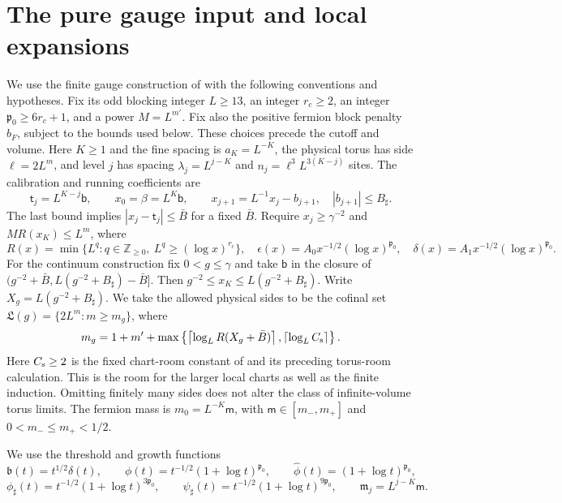 \documentclass[11pt,letterpaper,reqno]{amsart}
\theoremstyle{definition}
\theoremstyle{remark}
\begin{document}
\section{The pure gauge input and local expansions}\label{sec:qcd-gauge-input}

We use the finite gauge construction of \cite{YMM1} with the following
conventions and hypotheses. Fix its odd blocking integer $L\ge13$,
an integer $r_c\ge2$, an integer $\mathfrak p_0\ge6r_c+1$,
and a power $M=L^{m'}$. Fix also the positive fermion block
penalty $b_F$, subject to the bounds used below. These choices
precede the cutoff and volume. Here $K\ge1$ and the fine spacing is $a_K=L^{-K}$,
the physical torus has side $\ell=2L^m$, and level $j$ has spacing
$\lambda_j=L^{j-K}$ and $n_j=\ell^3L^{3(K-j)}$ sites.
The calibration and running coefficients are
\[
 \mathsf t_j=L^{K-j}\mathsf b,\qquad
 x_0=\beta=L^K\mathsf b,\qquad
 x_{j+1}=L^{-1}x_j-b_{j+1},\quad |b_{j+1}|\le B_\sharp.
\]
The last bound implies $|x_j-\mathsf t_j|\le\bar B$ for a
fixed $\bar B$. Require $x_j\ge\gamma^{-2}$ and
$MR(x_K)\le L^m$, where
\[
 R(x)=\min\{L^q:q\in\mathbb Z_{\ge0},\ L^q\ge(\log x)^{r_c}\},\quad
 \epsilon(x)=A_0x^{-1/2}(\log x)^{\mathfrak p_0},\quad
 \delta(x)=A_1x^{-1/2}(\log x)^{\mathfrak p_0}.
\]
For the continuum construction fix $0<g\le\gamma$ and take
$\mathsf b$ in the closure of
$(g^{-2}+\bar B,L(g^{-2}+B_\sharp)-\bar B]$.
Then $g^{-2}\le x_K\le L(g^{-2}+B_\sharp)$.
Write $X_g=L(g^{-2}+B_\sharp)$. We take the allowed physical
sides to be the cofinal set $\mathfrak L(g)=\{2L^m:m\ge m_g\}$, where
\[
 m_g=1+m'+\max\left\{
 \left\lceil\log_L R(X_g+\bar B)\right\rceil,
 \left\lceil\log_L C_{\rm s}\right\rceil\right\}.
\]
Here $C_{\rm s}\ge2$ is the fixed chart-room constant of
\cite[Cor.~4.167]{YMM1} and its preceding torus-room calculation.
This is the room for the larger local charts as well as the
finite induction. Omitting finitely many sides does not alter
the class of infinite-volume torus limits.
The fermion mass is $m_0=L^{-K}\mathsf m$, with
$\mathsf m\in[m_-,m_+]$ and $0<m_-\le m_+<1/2$.

We use the threshold and growth functions
\[
 \mathfrak b(t)=t^{1/2}\delta(t),\qquad
 \phi(t)=t^{-1/2}(1+\log t)^{\mathfrak p_0},\qquad
 \widehat\phi(t)=(1+\log t)^{\mathfrak p_0},
\]
\[
 \phi_\sharp(t)=t^{-1/2}(1+\log t)^{3\mathfrak p_0},\qquad
 \psi_\sharp(t)=t^{-1/2}(1+\log t)^{9\mathfrak p_0},\qquad
 \mathfrak m_j=L^{j-K}\mathsf m.
\]
\end{document}
